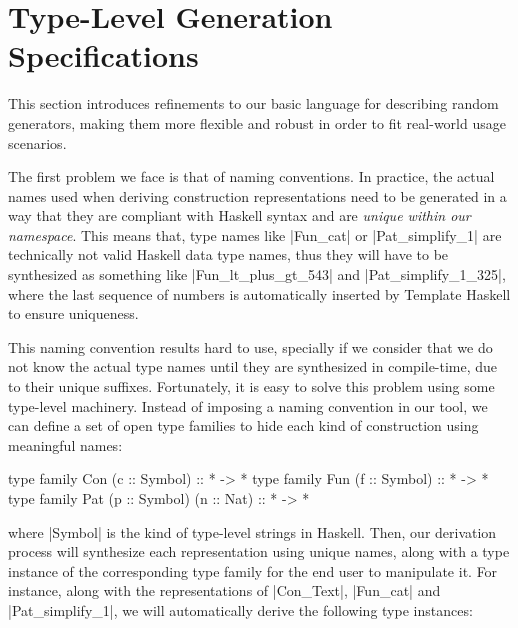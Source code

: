 \section{Type-Level Generation Specifications}
\label{sec:typelevel}

%
This section introduces refinements to our basic language for describing random
generators, making them more flexible and robust in order to fit real-world
usage scenarios.


%
%
%
The first problem we face is that of naming conventions.
%
In practice, the actual names used when deriving construction representations
need to be generated in a way that they are compliant with Haskell syntax and
are \emph{unique within our namespace}.
%
This means that, type names like |Fun_cat| or |Pat_simplify_1| are technically
not valid Haskell data type names, thus they will have to be synthesized as
something like |Fun_lt_plus_gt_543| and |Pat_simplify_1_325|, where the last
sequence of numbers is automatically inserted by Template Haskell to ensure
uniqueness.


This naming convention results hard to use, specially if we consider that we do
not know the actual type names until they are synthesized in compile-time, due
to their unique suffixes.
%
Fortunately, it is easy to solve this problem using some type-level machinery.
%
Instead of imposing a naming convention in our tool, we can define a set of open
type families to hide each kind of construction using meaningful names:

\begin{code}
type family Con (c :: Symbol)             :: * -> *
type family Fun (f :: Symbol)             :: * -> *
type family Pat (p :: Symbol) (n :: Nat)  :: * -> *
\end{code}

where |Symbol| is the kind of type-level strings in Haskell.
%
Then, our derivation process will synthesize each representation using unique
names, along with a type instance of the corresponding type family for the end
user to manipulate it.
%
For instance, along with the representations of |Con_Text|, |Fun_cat| and
|Pat_simplify_1|, we will automatically derive the following type instances:

